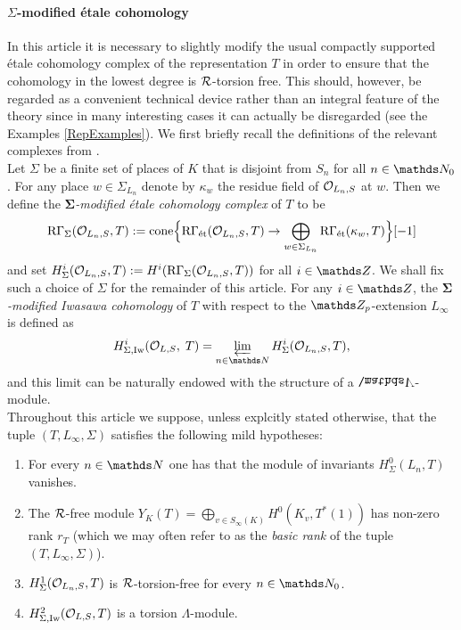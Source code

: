 \documentclass[a4paper, 
headsepline=off, DIV=12, titlepage=false]{scrartcl}
\begin{document}
\paragraph{$\Sigma$-modified \'etale cohomology}
In this article it is necessary to slightly modify the usual compactly supported \'etale cohomology complex of the representation $T$ in order to ensure that the cohomology in the lowest degree is $\mathcal{R}$-torsion free. This should, however, be regarded as a convenient technical device rather than an integral feature of the theory since in many interesting cases it can actually be disregarded (see the Examples \ref{RepExamples}). We first briefly recall the definitions of the relevant complexes from \cite[\S 2.3]{EulerSystemsSagaI}.  \\

Let $\Sigma$ be a finite set of places of $K$ that is disjoint from $S_n$ for all $n \in \N_0$. For any place $w \in \Sigma_{L_n}$ denote by $\kappa_w$ the residue field of $\mathcal{O}_{L_n, S}$ at $w$. Then we define the \emph{$\bm{\Sigma}$-modified \'etale cohomology complex} of $T$ to be
\[
\text{R} \Gamma_\Sigma (\mathcal{O}_{L_n, S}, T) := \mathrm{cone} \Big \{ \text{R} \Gamma_{\text{\'et}} ( \mathcal{O}_{L_n, S}, T) \to \bigoplus_{w \in \Sigma_{L_n}} \text{R} \Gamma_{\text{\'et}} ( \kappa_w, T) \Big \} [-1]
\]
and set $H^i_\Sigma (\mathcal{O}_{L_n, S}, T) := H^i (\text{R} \Gamma_\Sigma (\mathcal{O}_{L_n, S}, T))$ for all $i \in \Z$. 
 We shall fix such a choice of $\Sigma$ for the remainder of this article. For any $i \in \Z$, the \emph{$\bm{\Sigma}$-modified Iwasawa cohomology} of $T$ with respect to the $\Z_p$-extension $L_\infty$ is defined as 
\[
H^i_{\Sigma, \text{Iw}} (\bigO_{L, S}, \; T) = \varprojlim_{n \in \N} H^i_\Sigma(\cO_{L_n, S}, T),
\]
and this limit can be naturally endowed with the structure of a $\bLambda$-module. \\

Throughout this article we suppose, unless explcitly stated otherwise, that the tuple $(T,L_\infty, \Sigma)$ satisfies the following mild hypotheses:
\begin{hypotheses}\label{main-hypothesis}\text{}
    \begin{enumerate}[label=(\arabic*)]
        \item{For every $n \in \NN$ one has that the module of invariants $H^0_\Sigma(L_n, T)$ vanishes.}
        \item{The $\mathcal{R}$-free module $Y_K(T) = \bigoplus_{v \in S_\infty(K)} H^0(K_v,T^*(1))$ has non-zero rank $r_T$ (which we may often refer to as the \emph{basic rank} of the tuple $(T, L_\infty, \Sigma)$).}
        \item{$H^1_\Sigma(\mathcal{O}_{L_n, S}, T)$ is $\mathcal{R}$-torsion-free for every $n \in \N_0$}.
        \item{$H^2_{\Sigma,\mathrm{Iw}}(\mathcal{O}_{L,S},T)$ is a torsion $\Lambda$-module.}
    \end{enumerate}
\end{hypotheses}
\end{document}

